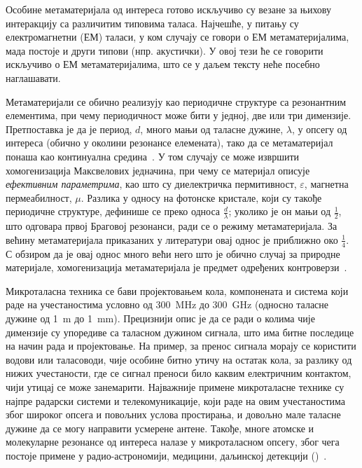 Особине метаматеријала од интереса готово искључиво су везане за њихову интеракцију са различитим типовима таласа. Најчешће, у питању су електромагнетни (ЕМ) таласи, у ком случају се говори о ЕМ метаматеријалима, мада постоје и други типови (нпр. акустички). У овој тези ће се говорити искључиво о ЕМ метаматеријалима, што се у даљем тексту неће посебно наглашавати.

Метаматеријали се обично реализују као периодичне структуре са резонантним елементима, при чему периодичност може бити у једној, две или три димензије. Претпоставка је да је период, $d$, много мањи од таласне дужине, $\lambda$, у опсегу од интереса (обично у околини резонансе елемената), тако да се метаматеријал понаша као континуална средина~\cite{landau1982}. У том случају се може извршити хомогенизација Максвелових једначина, при чему се материјал описује \emph{ефективним параметрима}, као што су диелектричка пермитивност, $\varepsilon$, магнетна пермеабилност, $\mu$. Разлика у односу на фотонске кристале, који су такође периодичне структуре, дефинише се преко односа $\frac{d}{\lambda}$; уколико је он мањи од $\frac{1}{2}$, што одговара првој Браговој резонанси, ради се о режиму метаматеријала. За већину метаматеријала приказаних у литератури овај однос је приближно око $\frac{1}{4}$. С обзиром да је овај однос много већи него што је обично случај за природне материјале, хомогенизација метаматеријала је предмет одређених контроверзи~\cite{simovski}.

Микроталасна техника се бави пројектовањем кола, компонената и система који раде на учестаностима условно од \SI{300}{\mega\hertz} до \SI{300}{\giga\hertz} (односно таласне дужине од \SI{1}{\meter} до \SI{1}{\milli\meter}). Прецизнији опис је да се ради о колима чије димензије су упоредиве са таласном дужином сигнала, што има битне последице на начин рада и пројектовање. На пример, за пренос сигнала морају се користити водови или таласоводи, чије особине битно утичу на остатак кола, за разлику од нижих учестаности, где се сигнал преноси било каквим електричним контактом, чији утицај се може занемарити. Најважније примене микроталасне технике су најпре радарски системи и телекомуникације, који раде на овим учестаностима због широког опсега и повољних услова простирања, и довољно мале таласне дужине да се могу направити усмерене антене. Такође, многе атомске и молекуларне резонансе од интереса налазе у микроталасном опсегу, због чега постоје примене у радио-астрономији, медицини, даљинској детекцији ()~\cite{djordjevic2005mikrotalasna,pozar2009microwave}.  \cite{markes_knjiga}

